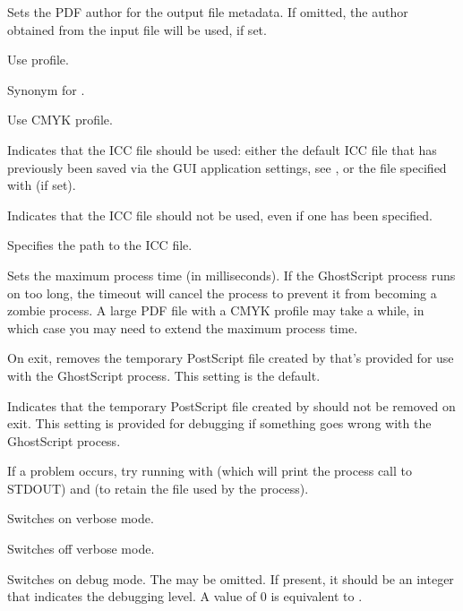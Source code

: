 Sets the PDF author for the output file metadata. If omitted, the author
obtained from the input file will be used, if set.

Use  profile.

Synonym for .

Use CMYK  profile.

Indicates that the ICC file should be used: either the default ICC
file that has previously been saved via the \gls{GUI} application
settings, see , or the file specified with
 (if set).

Indicates that the ICC file should not be used, even if one has been specified.

Specifies the path to the ICC file.

Sets the maximum process time (in milliseconds).
If the GhostScript process runs on too long, the timeout will cancel
the process to prevent it from becoming a zombie process.
A large PDF file with a CMYK profile may take a while, in which case
you may need to extend the maximum process time.


On exit, removes the temporary PostScript file created by  that's 
provided for use with the GhostScript process. This setting is the
default.


Indicates that the temporary PostScript file created by 
should not be removed on exit. This setting is provided for
debugging if something goes wrong with the GhostScript process.

\begin{information}
If a problem occurs, try running  with
 (which will print the process call to STDOUT) 
and  (to retain the file used by the process).
\end{information}


Switches on verbose mode.


Switches off verbose mode.


Switches on debug mode.
The  may be omitted. If present, it should be an integer
that indicates the debugging level. A value of 0 is equivalent to
.

